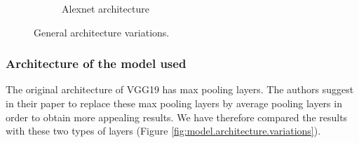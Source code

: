 \documentclass[twocolumn,superscriptaddress,aps,floatfix, nofootinbib]{revtex4-1}
\begin{document}
\begin{figure}[ht]
\begin{subfigure}[b]{0.22\textwidth}
            \caption{Alexnet architecture}
        \end{subfigure}
        \caption{General architecture variations.}
        \label{fig:arch.vars}
    \end{figure}
    
    \subsubsection{Architecture of the model used}
    
    The original architecture of VGG19 has max pooling layers. The authors suggest in their paper to replace these max pooling layers by average pooling layers in order to obtain more appealing results. We have therefore compared the results with these two types of layers (Figure \ref{fig:model.architecture.variations}).
    
\end{document}
